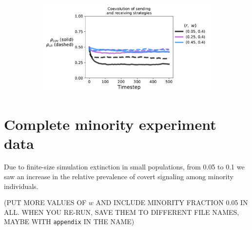 \documentclass[11pt,letterpaper]{article}
\begin{document}
\begin{appendices}
\begin{figure}[H]
\begin{subfigure}{0.49\textwidth}
  \caption{}
  \end{subfigure}
  \begin{subfigure}{0.49\textwidth}
    \includegraphics[width=\textwidth]{Figures/receptivity_evo_w=0p4.pdf}
  \caption{}
  \end{subfigure}
  \caption{}
  \label{fig:}
\end{figure}

\section{Complete minority experiment data}

Due to finite-size simulation extinction in small populations, from 0.05 to
0.1 we saw an increase in the relative prevalence of covert signaling among
minority individuals. 

(PUT MORE VALUES OF $w$ AND INCLUDE MINORITY FRACTION 0.05 IN ALL. WHEN
YOU RE-RUN, SAVE THEM TO DIFFERENT FILE NAMES, MAYBE WITH \texttt{appendix}
IN THE NAME)

\end{appendices}



\end{document}

